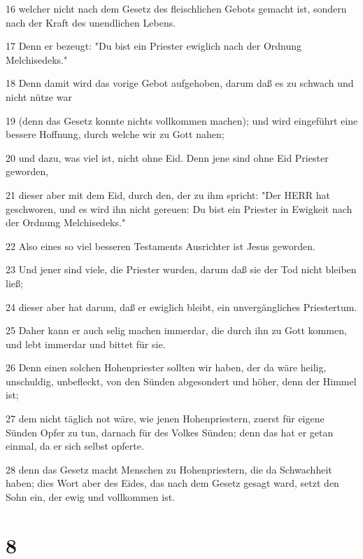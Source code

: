 \par 16 welcher nicht nach dem Gesetz des fleischlichen Gebots gemacht ist, sondern nach der Kraft des unendlichen Lebens.
\par 17 Denn er bezeugt: "Du bist ein Priester ewiglich nach der Ordnung Melchisedeks."
\par 18 Denn damit wird das vorige Gebot aufgehoben, darum daß es zu schwach und nicht nütze war
\par 19 (denn das Gesetz konnte nichts vollkommen machen); und wird eingeführt eine bessere Hoffnung, durch welche wir zu Gott nahen;
\par 20 und dazu, was viel ist, nicht ohne Eid. Denn jene sind ohne Eid Priester geworden,
\par 21 dieser aber mit dem Eid, durch den, der zu ihm spricht: "Der HERR hat geschworen, und es wird ihn nicht gereuen: Du bist ein Priester in Ewigkeit nach der Ordnung Melchisedeks."
\par 22 Also eines so viel besseren Testaments Ausrichter ist Jesus geworden.
\par 23 Und jener sind viele, die Priester wurden, darum daß sie der Tod nicht bleiben ließ;
\par 24 dieser aber hat darum, daß er ewiglich bleibt, ein unvergängliches Priestertum.
\par 25 Daher kann er auch selig machen immerdar, die durch ihn zu Gott kommen, und lebt immerdar und bittet für sie.
\par 26 Denn einen solchen Hohenpriester sollten wir haben, der da wäre heilig, unschuldig, unbefleckt, von den Sünden abgesondert und höher, denn der Himmel ist;
\par 27 dem nicht täglich not wäre, wie jenen Hohenpriestern, zuerst für eigene Sünden Opfer zu tun, darnach für des Volkes Sünden; denn das hat er getan einmal, da er sich selbst opferte.
\par 28 denn das Gesetz macht Menschen zu Hohenpriestern, die da Schwachheit haben; dies Wort aber des Eides, das nach dem Gesetz gesagt ward, setzt den Sohn ein, der ewig und vollkommen ist.

\chapter{8}

